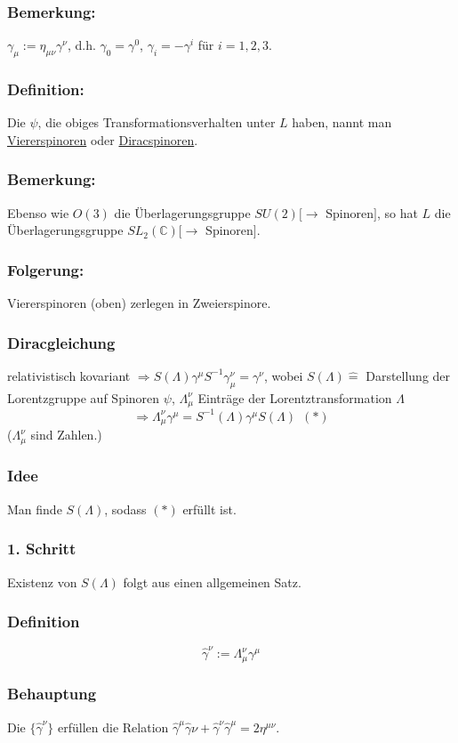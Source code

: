 \documentclass[twoside,a4paper]{scrartcl}
\newcommand{\C}{\mathbb{C}}
\renewcommand{\1}{\mathds{1}}
\newcommand{\Ra}{\Rightarrow}
\newcommand{\ra}{\rightarrow}
\newcommand{\entspricht}{\mathrel{\widehat{=}}}
\renewcommand{\L}{\Lambda}
\renewcommand{\C}{\mathbb{C}}
\begin{document}
\subsubsection*{Bemerkung:}
$\gamma_\mu:=\eta_{\mu\nu}\gamma^\nu$, d.h. $\gamma_0=\gamma^0$, $\gamma_i=-\gamma^i$ für $i=1,2,3$.
\subsubsection*{Definition:}
Die $\psi$, die obiges Transformationsverhalten unter $L$ haben, nannt man \underline{Viererspinoren} oder \underline{Diracspinoren}.
\subsubsection*{Bemerkung:}
Ebenso wie $O(3)$ die Überlagerungsgruppe $SU(2)[\ra$ Spinoren$]$, so hat $L$ die Überlagerungsgruppe $SL_2(\C)[\ra$ Spinoren$]$.
\subsubsection*{Folgerung:}
Viererspinoren (oben) zerlegen in Zweierspinore.


% 
\subsubsection*{Diracgleichung}
relativistisch kovariant $\Ra S(\L) \gamma^\mu S^{-1} \gamma_\mu^\nu=\gamma^\nu$, wobei $S(\L) \entspricht$ Darstellung der Lorentzgruppe auf Spinoren $\psi$, $\L^\nu_\mu$ Einträge der Lorentztransformation $\L$
$$\Ra \L^\nu_\mu\gamma^\mu=S^{-1}(\L) \gamma^\mu S(\L) \ \ (*)$$ 
($\L^\nu_\mu$ sind Zahlen.)
\subsubsection*{Idee}
Man finde $S(\L)$, sodass $(*)$ erfüllt ist.
\subsubsection*{1. Schritt}
Existenz von $S(\L)$ folgt aus einen allgemeinen Satz.
\subsubsection*{Definition}
$$\hat \gamma^\nu:= \L_\mu^\nu \gamma^\mu$$
\subsubsection*{Behauptung}
Die $\{\hat \gamma^\nu \}$ erfüllen die Relation $\hat\gamma^\mu\hat\gamma\nu+\hat \gamma^\nu\hat \gamma^\mu=2 \eta^{\mu\nu}$.
\end{document}

